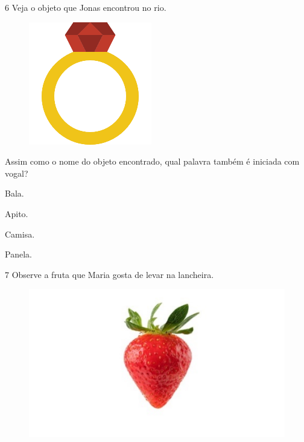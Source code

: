 \num{6} Veja o objeto que Jonas encontrou no rio.

\begin{figure}[htpb!]
\centering
\includegraphics[width=.5\textwidth]{media/image151.png}
\end{figure}


Assim como o nome do objeto encontrado, qual palavra também é iniciada com vogal?

\begin{escolha}
\item Bala.

\item Apito.

\item Camisa.

\item Panela.
\end{escolha}

\num{7} Observe a fruta que Maria gosta de levar na lancheira.

\begin{figure}[htpb!]
\centering
\includegraphics[width=.5\textwidth]{media/image152.jpeg}
\end{figure}


